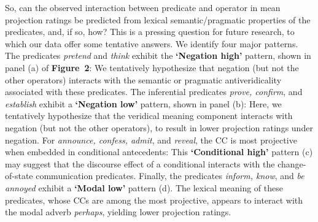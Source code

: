 \documentclass[12pt, a4paper]{article}
\begin{document}
	So, can the observed interaction between predicate and operator in mean projection ratings be predicted from lexical semantic/pragmatic properties of the predicates, and, if so, how?
	This is a pressing question for future research, to which our data offer some tentative answers. We identify four major patterns.
	The predicates \emph{pretend} and \emph{think} exhibit the {\bf `Negation high'} pattern, shown in panel (a) of \textbf{Figure~2}: We tentatively hypothesize that negation (but not the other operators) interacts with the semantic or pragmatic antiveridicality associated with these predicates.
	The inferential predicates \emph{prove, confirm}, and \emph{establish} exhibit a {\bf `Negation low'} pattern, shown in panel (b): Here, we tentatively hypothesize that the veridical meaning component interacts with negation (but not the other operators), to result in lower projection ratings under negation.
	For \emph{announce, confess, admit}, and \emph{reveal}, the CC is most projective when embedded in conditional antecedents: This {\bf `Conditional high'} pattern (c) may suggest that the discourse effect of a conditional interacts with the change-of-state communication predicates.
	Finally, the predicates  \emph{inform, know}, and \emph{be annoyed} exhibit a {\bf `Modal low'} pattern (d). The lexical meaning of these predicates, whose CCs are among the most projective, appears to interact with the modal adverb {\em perhaps}, yielding lower projection ratings.


\end{document}
